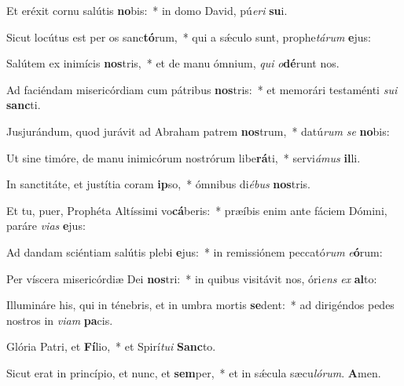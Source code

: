 
\vs Et eréxit cornu salútis \textbf{no}bis:~* in domo David, pú\textit{e}\textit{ri} \textbf{su}i.

\vs Sicut locútus est per os sanc\textbf{tó}rum,~* qui a sǽculo sunt, prophe\textit{tá}\textit{rum} \textbf{e}jus:

\vs Salútem ex inimícis \textbf{nos}tris,~* et de manu ómnium, \textit{qui} \textit{o}\textbf{dé}runt nos.

\vs Ad faciéndam misericórdiam cum pátribus \textbf{nos}tris:~* et memorári testaménti \textit{su}\textit{i} \textbf{sanc}ti.

\vs Jusjurándum, quod jurávit ad Abraham patrem \textbf{nos}trum,~* datú\textit{rum} \textit{se} \textbf{no}bis:

\vs Ut sine timóre, de manu inimicórum nostrórum libe\textbf{rá}ti,~* servi\textit{á}\textit{mus} \textbf{il}li.

\vs In sanctitáte, et justítia coram \textbf{ip}so,~* ómnibus di\textit{é}\textit{bus} \textbf{nos}tris.

\vs Et tu, puer, Prophéta Altíssimi vo\textbf{cá}beris:~* præíbis enim ante fáciem Dómini, paráre \textit{vi}\textit{as} \textbf{e}jus:

\vs Ad dandam sciéntiam salútis plebi \textbf{e}jus:~* in remissiónem peccató\textit{rum} \textit{e}\textbf{ó}rum:

\vs Per víscera misericórdiæ Dei \textbf{nos}tri:~* in quibus visitávit nos, óri\textit{ens} \textit{ex} \textbf{al}to:

\vs Illumináre his, qui in ténebris, et in umbra mortis \textbf{se}dent:~* ad dirigéndos pedes nostros in \textit{vi}\textit{am} \textbf{pa}cis.

\vs Glória Patri, et \textbf{Fí}lio,~* et Spirí\textit{tu}\textit{i} \textbf{Sanc}to.

\vs Sicut erat in princípio, et nunc, et \textbf{sem}per,~* et in sǽcula sæcu\textit{ló}\textit{rum}. \textbf{A}men.

